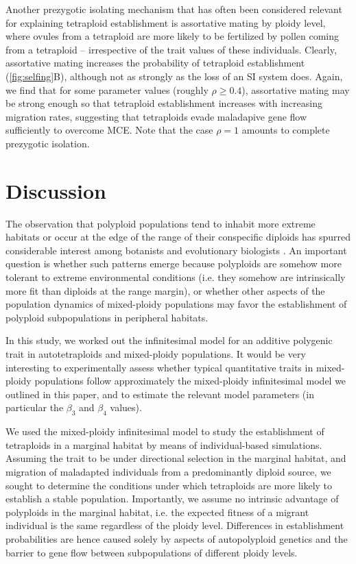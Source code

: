 \documentclass[12pt,a4paper]{article}
\begin{document}
Another prezygotic isolating mechanism that has often been considered relevant
for explaining tetraploid establishment is assortative mating by ploidy level,
where ovules from a tetraploid are more likely to be fertilized by
pollen coming from a tetraploid -- irrespective of the trait values of these
individuals.
Clearly, assortative mating increases the probability of tetraploid
establishment (\cref{fig:selfing}B), although not as strongly as the loss of an SI
system does.
Again, we find that for some parameter values (roughly $\rho \ge 0.4$),
assortative mating may be strong enough so that tetraploid establishment
increases with increasing migration rates, suggesting that tetraploids evade
maladapive gene flow sufficiently to overcome MCE.
Note that the case $\rho = 1$ amounts to complete prezygotic isolation.

\section*{Discussion}

The observation that polyploid populations tend to inhabit more extreme
habitats or occur at the edge of the range of their conspecific diploids
has spurred considerable interest among botanists and evolutionary biologists
\citep{rice2015,kolar2017,vandepeer2021,griswold2021,mortier2024}.
An important question is whether such patterns emerge because polyploids are
somehow more tolerant to extreme environmental conditions (i.e. they somehow
are intrinsically more fit than diploids at the range margin), or whether other
aspects of the population dynamics of mixed-ploidy populations may favor the
establishment of polyploid subpopulations in peripheral habitats.

In this study, we worked out the infinitesimal model for an additive polygenic
trait in autotetraploids and mixed-ploidy populations.
It would be very interesting to experimentally assess whether typical
quantitative traits in mixed-ploidy populations follow approximately the
mixed-ploidy infinitesimal model we outlined in this paper, and to estimate the
relevant model parameters (in particular the $\beta_3$ and $\beta_4$ values).

We used the mixed-ploidy infinitesimal model to study the establishment of
tetraploids in a marginal habitat by means of individual-based simulations. 
Assuming the trait to be under directional selection in the marginal habitat,
and migration of maladapted individuals from a predominantly diploid source,
we sought to determine the conditions under which tetraploids are more likely
to establish a stable population.
Importantly, we assume no intrinsic advantage of polyploids in the marginal
habitat, i.e. the expected fitness of a migrant individual is the same
regardless of the ploidy level.
Differences in establishment probabilities are hence caused solely by aspects
of autopolyploid genetics and the barrier to gene flow between subpopulations
of different ploidy levels.
\end{document}
